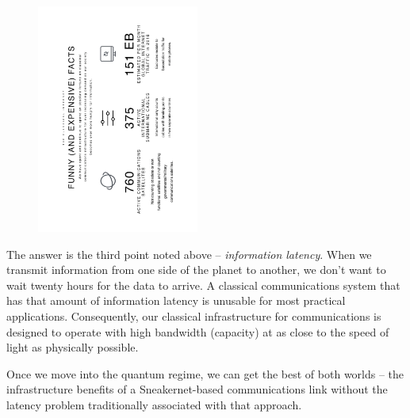 \documentclass[twocolumn, aps, rmp, amsmath, amssymb, nofootinbib, superscriptaddress, longbibliography, floatfix, table-of-contents, eqsecnum]{revtex4-2}
\begin{document}
\begin{figure}[htbp!]
	\includegraphics[clip=true, width=0.475\textwidth]{classical}
\end{figure}

The answer is the third point noted above -- \textit{information latency}. When we transmit information from one side of the planet to another, we don't want to wait twenty hours for the data to arrive. A classical communications system that has that amount of information latency is unusable for most practical applications. Consequently, our classical infrastructure for communications is designed to operate with high bandwidth (capacity) at as close to the speed of light as physically possible. 

Once we move into the quantum regime, we can get the best of both worlds -- the infrastructure benefits of a Sneakernet-based communications link without the latency problem traditionally associated with that approach. 
\end{document}
